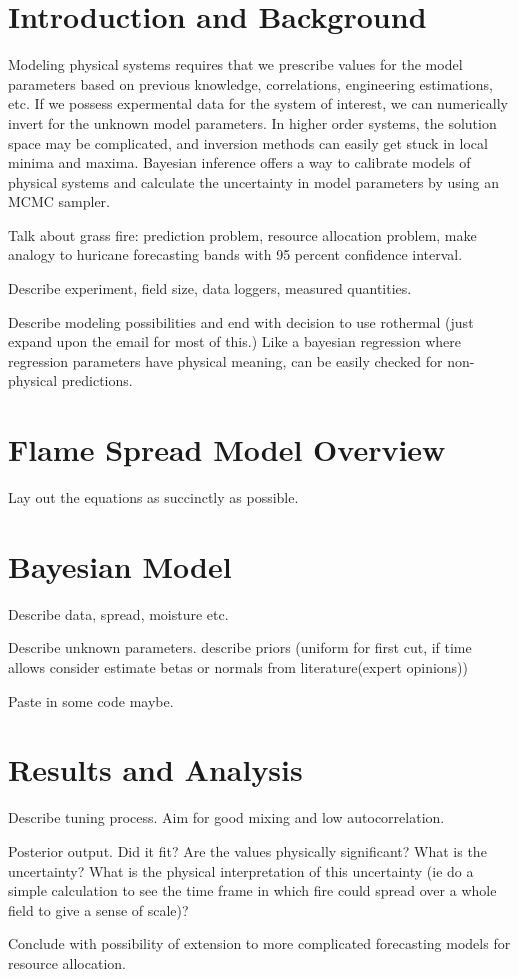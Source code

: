 \documentclass[11pt]{article}
\begin{document}
\pagestyle{plain}


\section{Introduction and Background}

Modeling physical systems requires that we prescribe values for the model parameters based on previous knowledge, correlations, engineering estimations, etc. If we possess expermental data for the system of interest, we can numerically invert for the unknown model parameters. In higher order systems, the solution space may be complicated, and inversion methods can easily get stuck in local minima and maxima. Bayesian inference offers a way to calibrate models of physical systems and calculate the uncertainty in model parameters by using an MCMC sampler.

Talk about grass fire: prediction problem, resource allocation problem, make analogy to huricane forecasting bands with 95 percent confidence interval.

Describe experiment, field size, data loggers, measured quantities.

Describe modeling possibilities and end with decision to use rothermal (just expand upon the email for most of this.) Like a bayesian regression where regression parameters have physical meaning, can be easily checked for non-physical predictions.


\section{Flame Spread Model Overview}

Lay out the equations as succinctly as possible.


\section{Bayesian Model}

Describe data, spread, moisture etc.

Describe unknown parameters. describe priors (uniform for first cut, if time allows consider estimate betas or normals from literature(expert opinions))

Paste in some code maybe.


\section{Results and Analysis}

Describe tuning process. Aim for good mixing and low autocorrelation.

Posterior output. Did it fit? Are the values physically significant? What is the uncertainty? What is the physical interpretation of this uncertainty (ie do a simple calculation to see the time frame in which fire could spread over a whole field to give a sense of scale)?

Conclude with possibility of extension to more complicated forecasting models for resource allocation.


% 
% 
\end{document}
